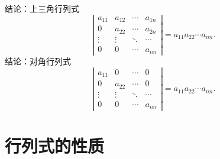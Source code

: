 {\color{green}结论：上三角行列式}
$$
\left|\begin{array}{cccc} 
    a_{11} & a_{12} & \cdots & a_{1n} \\
    0 & a_{22} & \cdots & a_{2n} \\
    \vdots & \vdots & \ddots & \cdots \\
    0 & 0 & \cdots & a_{nn} 
\end{array}\right|=a_{11}a_{22}\cdots a_{nn}.
$$
{\color{green}结论：对角行列式}
$$
\left|\begin{array}{cccc} 
    a_{11} & 0 & \cdots & 0 \\
    0 & a_{22} & \cdots & 0 \\
    \vdots & \vdots & \ddots & \cdots \\
    0 & 0 & \cdots & a_{nn}
\end{array}\right|=a_{11}a_{22}\cdots a_{nn}.
$$
\section{行列式的性质}
